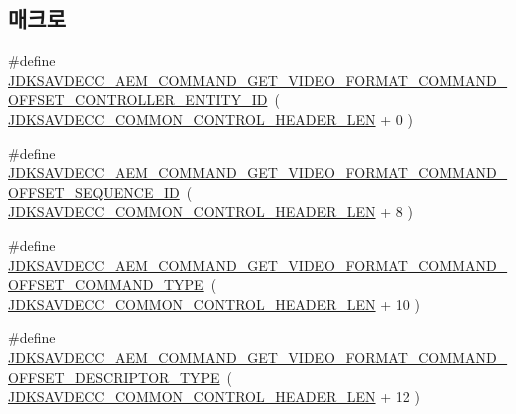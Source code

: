 \subsection*{매크로}
\begin{DoxyCompactItemize}
\item 
\#define \hyperlink{group__command__get__video__format_ga6f350f4b3fa21a6442e1ebbd649a9277}{J\+D\+K\+S\+A\+V\+D\+E\+C\+C\+\_\+\+A\+E\+M\+\_\+\+C\+O\+M\+M\+A\+N\+D\+\_\+\+G\+E\+T\+\_\+\+V\+I\+D\+E\+O\+\_\+\+F\+O\+R\+M\+A\+T\+\_\+\+C\+O\+M\+M\+A\+N\+D\+\_\+\+O\+F\+F\+S\+E\+T\+\_\+\+C\+O\+N\+T\+R\+O\+L\+L\+E\+R\+\_\+\+E\+N\+T\+I\+T\+Y\+\_\+\+ID}~( \hyperlink{group__jdksavdecc__avtp__common__control__header_gaae84052886fb1bb42f3bc5f85b741dff}{J\+D\+K\+S\+A\+V\+D\+E\+C\+C\+\_\+\+C\+O\+M\+M\+O\+N\+\_\+\+C\+O\+N\+T\+R\+O\+L\+\_\+\+H\+E\+A\+D\+E\+R\+\_\+\+L\+EN} + 0 )
\item 
\#define \hyperlink{group__command__get__video__format_gac69086c56aac92b90e90f43eeb3c890d}{J\+D\+K\+S\+A\+V\+D\+E\+C\+C\+\_\+\+A\+E\+M\+\_\+\+C\+O\+M\+M\+A\+N\+D\+\_\+\+G\+E\+T\+\_\+\+V\+I\+D\+E\+O\+\_\+\+F\+O\+R\+M\+A\+T\+\_\+\+C\+O\+M\+M\+A\+N\+D\+\_\+\+O\+F\+F\+S\+E\+T\+\_\+\+S\+E\+Q\+U\+E\+N\+C\+E\+\_\+\+ID}~( \hyperlink{group__jdksavdecc__avtp__common__control__header_gaae84052886fb1bb42f3bc5f85b741dff}{J\+D\+K\+S\+A\+V\+D\+E\+C\+C\+\_\+\+C\+O\+M\+M\+O\+N\+\_\+\+C\+O\+N\+T\+R\+O\+L\+\_\+\+H\+E\+A\+D\+E\+R\+\_\+\+L\+EN} + 8 )
\item 
\#define \hyperlink{group__command__get__video__format_ga0c5335577c69ec5c5a62294c5c9d59e2}{J\+D\+K\+S\+A\+V\+D\+E\+C\+C\+\_\+\+A\+E\+M\+\_\+\+C\+O\+M\+M\+A\+N\+D\+\_\+\+G\+E\+T\+\_\+\+V\+I\+D\+E\+O\+\_\+\+F\+O\+R\+M\+A\+T\+\_\+\+C\+O\+M\+M\+A\+N\+D\+\_\+\+O\+F\+F\+S\+E\+T\+\_\+\+C\+O\+M\+M\+A\+N\+D\+\_\+\+T\+Y\+PE}~( \hyperlink{group__jdksavdecc__avtp__common__control__header_gaae84052886fb1bb42f3bc5f85b741dff}{J\+D\+K\+S\+A\+V\+D\+E\+C\+C\+\_\+\+C\+O\+M\+M\+O\+N\+\_\+\+C\+O\+N\+T\+R\+O\+L\+\_\+\+H\+E\+A\+D\+E\+R\+\_\+\+L\+EN} + 10 )
\item 
\#define \hyperlink{group__command__get__video__format_ga1d825a4673b5d5c62d77ecd8d4cace55}{J\+D\+K\+S\+A\+V\+D\+E\+C\+C\+\_\+\+A\+E\+M\+\_\+\+C\+O\+M\+M\+A\+N\+D\+\_\+\+G\+E\+T\+\_\+\+V\+I\+D\+E\+O\+\_\+\+F\+O\+R\+M\+A\+T\+\_\+\+C\+O\+M\+M\+A\+N\+D\+\_\+\+O\+F\+F\+S\+E\+T\+\_\+\+D\+E\+S\+C\+R\+I\+P\+T\+O\+R\+\_\+\+T\+Y\+PE}~( \hyperlink{group__jdksavdecc__avtp__common__control__header_gaae84052886fb1bb42f3bc5f85b741dff}{J\+D\+K\+S\+A\+V\+D\+E\+C\+C\+\_\+\+C\+O\+M\+M\+O\+N\+\_\+\+C\+O\+N\+T\+R\+O\+L\+\_\+\+H\+E\+A\+D\+E\+R\+\_\+\+L\+EN} + 12 )

\end{DoxyCompactItemize}
